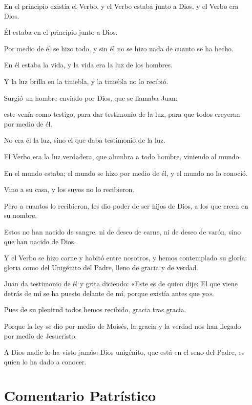 		\begin{scripture}
			En el principio existía el Verbo, y el Verbo estaba junto a Dios, y el Verbo era Dios.
			
			Él estaba en el principio junto a Dios.
			
			Por medio de él se hizo todo, y sin él no se hizo nada de cuanto se ha hecho.
			
			En él estaba la vida, y la vida era la luz de los hombres.
			
			Y la luz brilla en la tiniebla, y la tiniebla no lo recibió.
			
			Surgió un hombre enviado por Dios, que se llamaba Juan:
			
			este venía como testigo, para dar testimonio de la luz, para que todos creyeran por medio de él.
			
			No era él la luz, sino el que daba testimonio de la luz.
			
			El Verbo era la luz verdadera, que alumbra a todo hombre, viniendo al mundo.
			
			En el mundo estaba; el mundo se hizo por medio de él, y el mundo no lo conoció.
			
			Vino a su casa, y los suyos no lo recibieron.
			
			Pero a cuantos lo recibieron, les dio poder de ser hijos de Dios, a los que creen en su nombre.
			
			Estos no han nacido de sangre, ni de deseo de carne, ni de deseo de varón, sino que han nacido de Dios.
			
			Y el Verbo se hizo carne y habitó entre nosotros, y hemos contemplado su gloria: gloria como del Unigénito del Padre, lleno de gracia y de verdad.
			
			Juan da testimonio de él y grita diciendo: «Este es de quien dije: El que viene detrás de mí se ha puesto delante de mí, porque existía antes que yo».
			
			Pues de su plenitud todos hemos recibido, gracia tras gracia.
			
			Porque la ley se dio por medio de Moisés, la gracia y la verdad nos han llegado por medio de Jesucristo.
			
			A Dios nadie lo ha visto jamás: Dios unigénito, que está en el seno del Padre, es quien lo ha dado a conocer.
		\end{scripture}


	\section{Comentario Patrístico}
	
